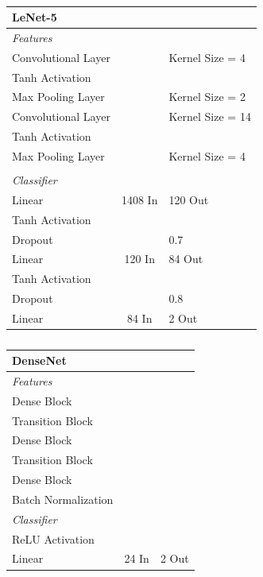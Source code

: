 \documentclass[manuscript,screen,review]{acmart}
\begin{document}
\begin{table}[h!]
  \caption{}
  \label{tab:lenet5}
  \begin{tabular}{lcl}
    \textbf{LeNet-5} \\
    \toprule
    \textit{Features} \\
    \midrule
    Convolutional Layer &  & Kernel Size = 4 \\
    Tanh Activation & & \\
    Max Pooling Layer & & Kernel Size = 2\\
    Convolutional Layer &  & Kernel Size = 14 \\
    Tanh Activation & & \\
    Max Pooling Layer & & Kernel Size = 4\\
     & & \\
    \textit{Classifier} \\
    \midrule
    Linear & 1408 In & 120 Out\\
    Tanh Activation & & \\
    Dropout & & 0.7 \\
    Linear & 120 In & 84 Out\\
    Tanh Activation & & \\
    Dropout & & 0.8 \\
    Linear & 84 In & 2 Out\\
  \bottomrule
\end{tabular}
\end{table}


\begin{table}[h!]
\caption{}
  \label{tab:densenet}
  \begin{tabular}{lcl}
    \textbf{DenseNet} \\
    \toprule
    \textit{Features} \\
    \midrule
    Dense Block &  &  \\
    Transition Block & & \\
    Dense Block &  &  \\
    Transition Block & & \\
    Dense Block &  &  \\
    Batch Normalization & & \\
    \textit{Classifier} \\
    \midrule
    ReLU Activation &  & \\
    Linear & 24 In & 2 Out\\
    \bottomrule
\end{tabular}
\end{table}
\end{document}
